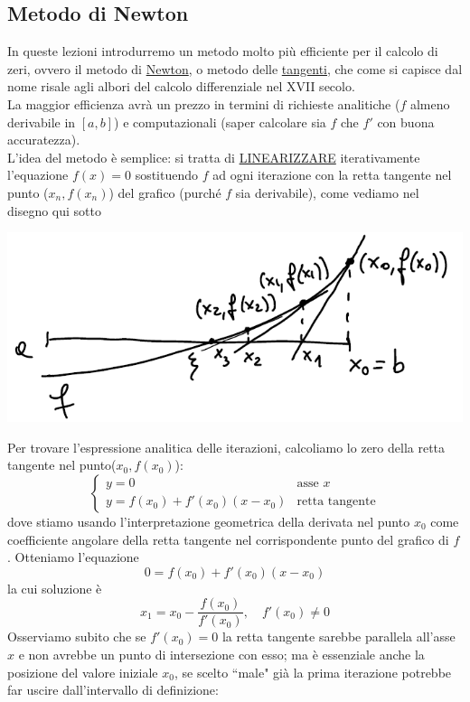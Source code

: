 \subsection{Metodo di Newton}
In queste lezioni introdurremo un metodo molto più efficiente per il calcolo di zeri, ovvero il metodo di \uline{Newton}, o metodo delle \uline{tangenti}, che come si capisce dal nome risale agli albori del calcolo differenziale nel XVII secolo.\\
La maggior efficienza avrà un prezzo in termini di richieste analitiche ($f$ almeno derivabile in $[a, b]$) e computazionali (saper calcolare sia $f$ che $f'$ con buona accuratezza).\\
L'idea del metodo è semplice: si tratta di \uline{LINEARIZZARE} iterativamente l'equazione $f(x) = 0$ sostituendo $f$ ad ogni iterazione con la retta tangente nel punto ($x_n, f(x_n)$) del grafico (purché $f$ sia derivabile), come vediamo nel disegno qui sotto 
\begin{center}
    \includegraphics[scale=0.7]{foto/pagina5_1}
\end{center}
Per trovare l'espressione analitica delle iterazioni, calcoliamo lo zero della retta tangente nel punto($x_0,f(x_0)$):
\[ \begin{cases}
    y = 0 & \text{asse } x\\
    y = f(x_0) + f'(x_0)(x-x_0) & \text{retta tangente}
\end{cases}\]
dove stiamo usando l'interpretazione geometrica della derivata nel punto $x_0$ come coefficiente angolare della retta tangente nel corrispondente punto del grafico di $f$. Otteniamo l'equazione 
\[ 0=f(x_0)+ f'(x_0)(x-x_0) \]
la cui soluzione è
\[ x_1=x_0-\frac{f(x_0)}{f'(x_0)}, \quad f'(x_0)\neq 0 \]
Osserviamo subito che se $f'(x_0)=0$ la retta tangente sarebbe parallela all'asse $x$ e non avrebbe un punto di intersezione con esso; ma è essenziale anche la posizione del valore iniziale $x_0$, se scelto ``male" già la prima iterazione potrebbe far uscire dall'intervallo di definizione:\\
